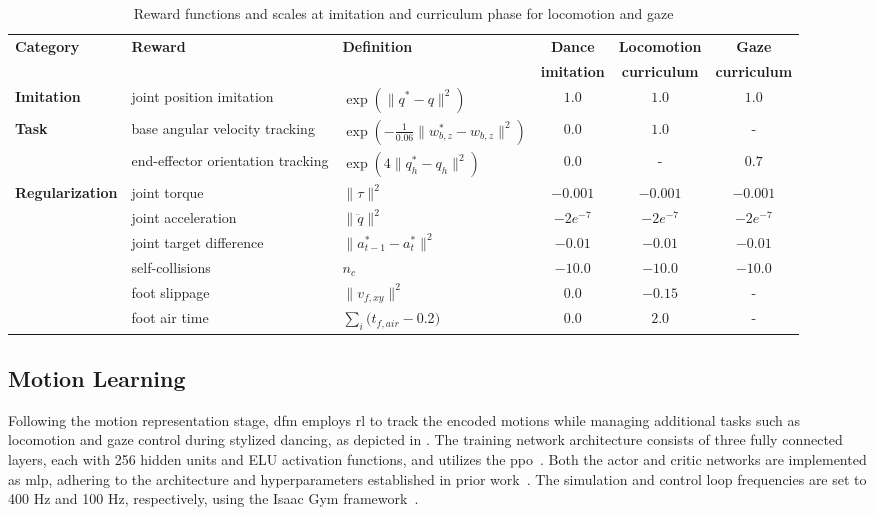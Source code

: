 \begin{table*}[t]
\caption{Reward functions and scales at imitation and curriculum phase for locomotion and gaze}
\label{table:reward}
\begin{center}
\begin{tabular}{lllccc}
\toprule
\textbf{Category} & \textbf{Reward} & \textbf{Definition} & \textbf{Dance} & \textbf{Locomotion} & \textbf{Gaze}\\
&&& \textbf{imitation} & \textbf{curriculum} & \textbf{curriculum} \\
\midrule
\multirow{1}{*}{\textbf{Imitation}} & joint position imitation & $\exp(\|{q}^* - {q}\|^2 )$ & $1.0$ & $1.0$ & $1.0$ \\
\midrule
\multirow{2}{*}{\textbf{Task}} 
 & base angular velocity tracking & $\exp(-\frac{1}{0.06}\|{w}_{b,z}^* - {w}_{b,z}\|^2)$ & $0.0$ & $1.0$ & - \\
 & end-effector orientation tracking  & $\exp(4\|{q}_{h}^* - {q}_{h}\|^2 )$ & $0.0$ & - & $0.7$ \\
\midrule
\multirow{6}{*}{\textbf{Regularization}} & joint torque & $\|{\tau}\|^2$ & $-0.001$ & $-0.001$ & $-0.001$  \\
 & joint acceleration & $\|{\ddot{q}}\|^2$ & $-2e^{-7}$ & $-2e^{-7}$ & $-2e^{-7}$ \\
 & joint target difference & $\|{a}^*_{t-1} - {a}^*_{t}\|^2$ & $-0.01$ & $-0.01$ & $-0.01$ \\
 & self-collisions & $n_{c}$ & $-10.0$ & $-10.0$ & $-10.0$ \\
 & foot slippage & $\|{v}_{f,xy}\|^2$ & $0.0$ & $-0.15$ & - \\
 & foot air time & $\sum_i ({t}_{f,air} - $0.2$)$ & $0.0$ & $2.0$ & - \\
\bottomrule
\end{tabular}
\end{center}
\end{table*}

\subsection{Motion Learning}
Following the motion representation stage, \ac{dfm} employs \ac{rl} to track the encoded motions while managing additional tasks such as locomotion and gaze control during stylized dancing, as depicted in .
The training network architecture consists of three fully connected layers, each with 256 hidden units and ELU activation functions, and utilizes the \ac{ppo}~\cite{ppo}.
Both the actor and critic networks are implemented as \ac{mlp}, adhering to the architecture and hyperparameters established in prior work~\cite{fld}.
The simulation and control loop frequencies are set to 400 Hz and 100 Hz, respectively, using the Isaac Gym framework~\cite{Makoviychuk2021-th}.

